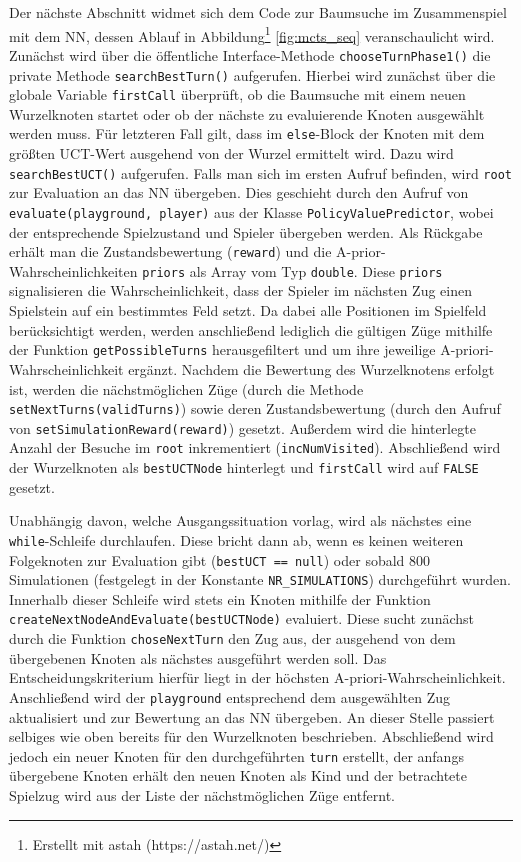 \documentclass[12pt,a4paper]{article}
\begin{document}
Der nächste Abschnitt widmet sich dem Code zur Baumsuche im Zusammenspiel mit dem NN, dessen Ablauf in Abbildung\footnote{Erstellt mit astah (https://astah.net/)} \ref{fig:mcts_seq} veranschaulicht wird. Zunächst wird über die öffentliche Interface-Methode \texttt{chooseTurnPhase1()} die private Methode \texttt{searchBestTurn()} aufgerufen. Hierbei wird zunächst über die globale Variable \texttt{firstCall} überprüft, ob die Baumsuche mit einem neuen Wurzelknoten startet oder ob der nächste zu evaluierende Knoten ausgewählt werden muss. Für letzteren Fall gilt, dass im \texttt{else}-Block der Knoten mit dem größten UCT-Wert ausgehend von der Wurzel ermittelt wird. Dazu wird \texttt{searchBestUCT()} aufgerufen. Falls man sich im ersten Aufruf befinden, wird \texttt{root} zur Evaluation an das NN übergeben. Dies geschieht durch den Aufruf von \texttt{evaluate(playground, player)} aus der Klasse \texttt{PolicyValuePredictor}, wobei der entsprechende Spielzustand und Spieler übergeben werden. Als Rückgabe erhält man die Zustandsbewertung (\texttt{reward}) und die A-prior-Wahrscheinlichkeiten \texttt{priors} als Array vom Typ \texttt{double}. Diese \texttt{priors} signalisieren die Wahrscheinlichkeit, dass der Spieler im nächsten Zug einen Spielstein auf ein bestimmtes Feld setzt. Da dabei alle Positionen im Spielfeld berücksichtigt werden, werden anschließend lediglich die gültigen Züge mithilfe der Funktion \texttt{getPossibleTurns} herausgefiltert und um ihre jeweilige A-priori-Wahrscheinlichkeit ergänzt. Nachdem die Bewertung des Wurzelknotens erfolgt ist, werden die nächstmöglichen Züge (durch die Methode \texttt{setNextTurns(validTurns)}) sowie deren Zustandsbewertung (durch den Aufruf von \texttt{setSimulationReward(reward)}) gesetzt. Außerdem wird die hinterlegte Anzahl der Besuche im \texttt{root} inkrementiert (\texttt{incNumVisited}). Abschließend wird der Wurzelknoten als \texttt{bestUCTNode} hinterlegt und \texttt{firstCall} wird auf \texttt{FALSE} gesetzt. 

Unabhängig davon, welche Ausgangssituation vorlag, wird als nächstes eine \texttt{while}-Schleife durchlaufen. Diese bricht dann ab, wenn es keinen weiteren Folgeknoten zur Evaluation gibt (\texttt{bestUCT == null}) oder sobald 800 Simulationen (festgelegt in der Konstante \texttt{NR\_SIMULATIONS}) durchgeführt wurden. Innerhalb dieser Schleife wird stets ein Knoten mithilfe der Funktion \texttt{createNextNodeAndEvaluate(bestUCTNode)} evaluiert. Diese sucht zunächst durch die Funktion \texttt{choseNextTurn} den Zug aus, der ausgehend von dem übergebenen Knoten als nächstes ausgeführt werden soll. Das Entscheidungskriterium hierfür liegt in der höchsten A-priori-Wahrscheinlichkeit. Anschließend wird der \texttt{playground} entsprechend dem ausgewählten Zug aktualisiert und zur Bewertung an das NN übergeben. An dieser Stelle passiert selbiges wie oben bereits für den Wurzelknoten beschrieben. Abschließend wird jedoch ein neuer Knoten für den durchgeführten \texttt{turn} erstellt, der anfangs übergebene Knoten erhält den neuen Knoten als Kind und der betrachtete Spielzug wird aus der Liste der nächstmöglichen Züge entfernt.
\end{document}
